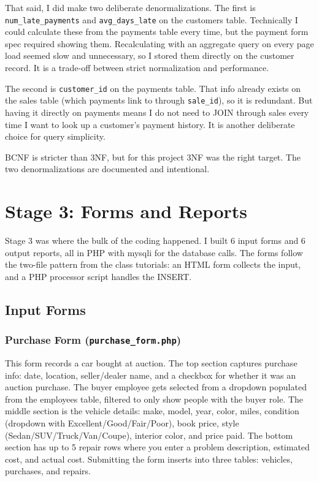 \documentclass[12pt]{article}
\begin{document}
That said, I did make two deliberate denormalizations. The first is \texttt{num\_late\_payments} and \texttt{avg\_days\_late} on the customers table. Technically I could calculate these from the payments table every time, but the payment form spec required showing them. Recalculating with an aggregate query on every page load seemed slow and unnecessary, so I stored them directly on the customer record. It is a trade-off between strict normalization and performance.

The second is \texttt{customer\_id} on the payments table. That info already exists on the sales table (which payments link to through \texttt{sale\_id}), so it is redundant. But having it directly on payments means I do not need to JOIN through sales every time I want to look up a customer's payment history. It is another deliberate choice for query simplicity.

BCNF is stricter than 3NF, but for this project 3NF was the right target. The two denormalizations are documented and intentional.

\section{Stage 3: Forms and Reports}

Stage 3 was where the bulk of the coding happened. I built 6 input forms and 6 output reports, all in PHP with mysqli for the database calls. The forms follow the two-file pattern from the class tutorials: an HTML form collects the input, and a PHP processor script handles the INSERT.

\subsection{Input Forms}

\subsubsection*{Purchase Form (\texttt{purchase\_form.php})}

This form records a car bought at auction. The top section captures purchase info: date, location, seller/dealer name, and a checkbox for whether it was an auction purchase. The buyer employee gets selected from a dropdown populated from the employees table, filtered to only show people with the buyer role. The middle section is the vehicle details: make, model, year, color, miles, condition (dropdown with Excellent/Good/Fair/Poor), book price, style (Sedan/SUV/Truck/Van/Coupe), interior color, and price paid. The bottom section has up to 5 repair rows where you enter a problem description, estimated cost, and actual cost. Submitting the form inserts into three tables: vehicles, purchases, and repairs.
\end{document}
